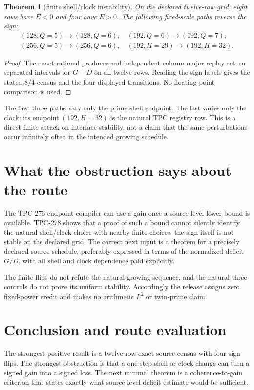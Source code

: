 \documentclass[11pt]{article}
\newtheorem{theorem}{Theorem}
\begin{document}
\begin{theorem}[finite shell/clock instability]
On the declared twelve-row grid, eight rows have $E<0$ and four have
$E>0$.  The following fixed-scale paths reverse the sign:
\[
\begin{array}{c}
(128,Q=5)\to(128,Q=6),\quad
(192,Q=6)\to(192,Q=7),\\
(256,Q=5)\to(256,Q=6),\quad
(192,H=29)\to(192,H=32).
\end{array}
\]
\end{theorem}

\begin{proof}
The exact rational producer and independent column-major replay return
separated intervals for $G-D$ on all twelve rows.  Reading the sign labels
gives the stated $8/4$ census and the four displayed transitions.  No
floating-point comparison is used.
\end{proof}

The first three paths vary only the prime shell endpoint.  The last varies
only the clock; its endpoint $(192,H=32)$ is the natural TPC registry row.
This is a direct finite attack on interface stability, not a claim that the
same perturbations occur infinitely often in the intended growing schedule.

\section{What the obstruction says about the route}

The TPC-276 endpoint compiler can use a gain once a source-level lower bound
is available.  TPC-278 shows that a proof of such a bound cannot silently
identify the natural shell/clock choice with nearby finite choices: the sign
itself is not stable on the declared grid.  The correct next input is a
theorem for a precisely declared source schedule, preferably expressed in
terms of the normalized deficit $G/D$, with all shell and clock dependence
paid explicitly.

The finite flips do not refute the natural growing sequence, and the natural
three controls do not prove its uniform stability.  Accordingly the release
assigns zero fixed-power credit and makes no arithmetic $L^2$ or twin-prime
claim.

\section{Conclusion and route evaluation}

The strongest positive result is a twelve-row exact source census with four
sign flips.  The strongest obstruction is that a one-step shell or clock
change can turn a signed gain into a signed loss.  The next minimal theorem
is a coherence-to-gain criterion that states exactly what source-level
deficit estimate would be sufficient.
\end{document}
